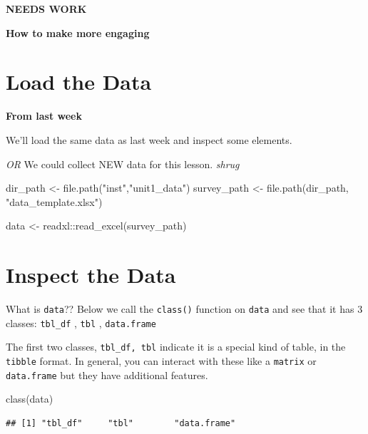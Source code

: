 \documentclass[
]{book}
\newenvironment{Shaded}{\begin{snugshade}}{\end{snugshade}}
\newcommand{\FunctionTok}[1]{\textcolor[rgb]{0.00,0.00,0.00}{#1}}
\newcommand{\NormalTok}[1]{#1}
\newcommand{\OtherTok}[1]{\textcolor[rgb]{0.56,0.35,0.01}{#1}}
\newcommand{\SpecialCharTok}[1]{\textcolor[rgb]{0.00,0.00,0.00}{#1}}
\newcommand{\StringTok}[1]{\textcolor[rgb]{0.31,0.60,0.02}{#1}}
\begin{document}
\textbf{NEEDS WORK}

\textbf{How to make more engaging}

\hypertarget{load-the-data-1}{%
\section{Load the Data}\label{load-the-data-1}}

\textbf{From last week}

We'll load the same data as last week and inspect some elements.

\emph{OR} We could collect NEW data for this lesson. \emph{shrug}

\begin{Shaded}
\begin{Highlighting}[]
\NormalTok{dir\_path }\OtherTok{\textless{}{-}} \FunctionTok{file.path}\NormalTok{(}\StringTok{"inst"}\NormalTok{,}\StringTok{"unit1\_data"}\NormalTok{)}
\NormalTok{survey\_path }\OtherTok{\textless{}{-}} \FunctionTok{file.path}\NormalTok{(dir\_path, }\StringTok{"data\_template.xlsx"}\NormalTok{)}

\NormalTok{data }\OtherTok{\textless{}{-}}\NormalTok{ readxl}\SpecialCharTok{::}\FunctionTok{read\_excel}\NormalTok{(survey\_path)}
\end{Highlighting}
\end{Shaded}

\hypertarget{inspect-the-data-1}{%
\section{Inspect the Data}\label{inspect-the-data-1}}

What is \texttt{data}?? Below we call the \texttt{class()} function on \texttt{data} and see that it has 3 classes:
\texttt{tbl\_df} , \texttt{tbl} , \texttt{data.frame}

The first two classes, \texttt{tbl\_df,\ tbl} indicate it is a special kind of table, in the \texttt{tibble} format. In general, you can interact with these like a \texttt{matrix} or \texttt{data.frame} but they have additional features.

\begin{Shaded}
\begin{Highlighting}[]
\FunctionTok{class}\NormalTok{(data)}
\end{Highlighting}
\end{Shaded}

\begin{verbatim}
## [1] "tbl_df"     "tbl"        "data.frame"
\end{verbatim}
\end{document}

